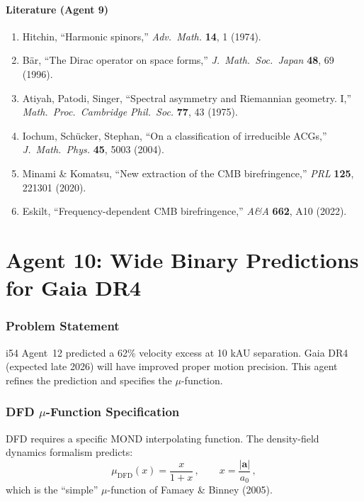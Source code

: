\documentclass[11pt,a4paper]{article}
\begin{document}
\subsection{Literature (Agent 9)}

\begin{enumerate}
\item Hitchin, ``Harmonic spinors,'' \textit{Adv.\ Math.} \textbf{14}, 1 (1974).
\item B\"ar, ``The Dirac operator on space forms,'' \textit{J.\ Math.\ Soc.\ Japan} \textbf{48}, 69 (1996).
\item Atiyah, Patodi, Singer, ``Spectral asymmetry and Riemannian geometry. I,'' \textit{Math.\ Proc.\ Cambridge Phil.\ Soc.} \textbf{77}, 43 (1975).
\item Iochum, Sch\"ucker, Stephan, ``On a classification of irreducible ACGs,'' \textit{J.\ Math.\ Phys.} \textbf{45}, 5003 (2004).
\item Minami \& Komatsu, ``New extraction of the CMB birefringence,'' \textit{PRL} \textbf{125}, 221301 (2020).
\item Eskilt, ``Frequency-dependent CMB birefringence,'' \textit{A\&A} \textbf{662}, A10 (2022).
\end{enumerate}


\part{Agent 10: Wide Binary Predictions for Gaia DR4}
\label{part:wide-binary}

\section{Problem Statement}

i54 Agent~12 predicted a 62\% velocity excess at 10 kAU separation. Gaia DR4 (expected late 2026) will have improved proper motion precision. This agent refines the prediction and specifies the $\mu$-function.

\section{DFD $\mu$-Function Specification}

DFD requires a specific MOND interpolating function. The density-field dynamics formalism predicts:
\begin{equation}
\mu_{\mathrm{DFD}}(x) = \frac{x}{1 + x}\,,\qquad x = \frac{|\mathbf{a}|}{a_0}\,,
\end{equation}
which is the ``simple'' $\mu$-function of Famaey \& Binney (2005).
\end{document}
